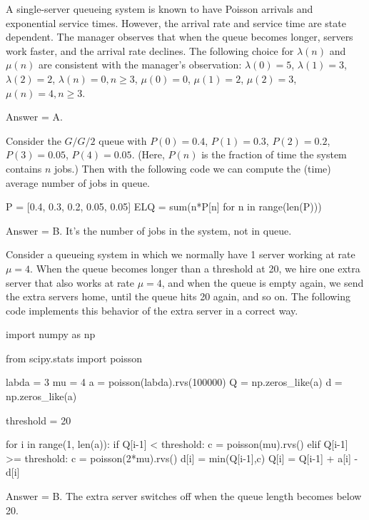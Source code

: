 \begin{exercise}[201903]
 A single-server queueing system is known to have Poisson
 arrivals and exponential service times. However, the arrival rate
 and service time are state dependent. The manager observes that when the queue becomes longer,
 servers work faster, and the arrival rate declines. The following choice for $\lambda(n)$ and $\mu(n)$ are consistent with the manager's observation:
 $\lambda(0) = 5$, $\lambda(1)=3$, $\lambda(2)=2$,
 $\lambda(n)=0, n\geq 3$, $\mu(0) = 0$, $\mu(1)=2$, $\mu(2)=3$, $\mu(n)=4, n\geq 3$. 

\begin{solution}
Answer = A.
\end{solution}
\end{exercise}

\begin{exercise}[201903]
 Consider the $G/G/2$ queue with $P(0) = 0.4$, $P(1)=0.3$, $P(2)= 0.2$, $P(3)=0.05$, $P(4)=0.05$. (Here, $P(n)$ is the fraction of time the system contains $n$ jobs.)
Then with the following code we can compute the (time) average number of jobs in queue.
\begin{pyconsole}
P = [0.4, 0.3, 0.2, 0.05, 0.05]
ELQ = sum(n*P[n] for n in range(len(P)))
\end{pyconsole}

\begin{solution}
Answer = B. It's the number of jobs in the system, not in queue.
\end{solution}
\end{exercise}

\begin{exercise}[201903]
 Consider a queueing system in which we normally have 1 server working at rate $\mu=4$.
 When the queue becomes longer than a threshold at 20, we hire one extra server that also works at rate $\mu=4$, and when the queue is empty again, we send the extra servers home, until the queue hits 20 again, and so on.
 The following code implements this behavior of the extra server in a correct way.

 \begin{pyverbatim}
import numpy as np

from scipy.stats import poisson

labda = 3
mu = 4
a = poisson(labda).rvs(100000)
Q = np.zeros_like(a)
d = np.zeros_like(a)

threshold = 20

for i in range(1, len(a)):
 if Q[i-1] < threshold:
 c = poisson(mu).rvs()
 elif Q[i-1] >= threshold:
 c = poisson(2*mu).rvs()
 d[i] = min(Q[i-1],c)
 Q[i] = Q[i-1] + a[i] - d[i]
 
 \end{pyverbatim}

\begin{solution}
Answer = B. The extra server switches off when the queue length becomes below 20.
\end{solution}
\end{exercise}

